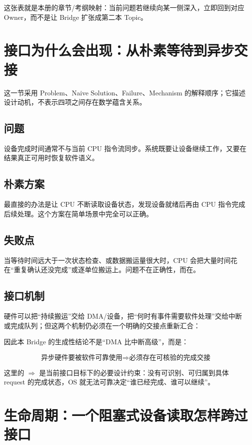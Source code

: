 \documentclass[UTF8,fontset=none,11pt,a4paper]{ctexart}
\begin{document}
这张表就是本册的章节/考纲映射：当前问题若继续向某一侧深入，立即回到对应 Owner，而不是让 Bridge 扩张成第二本 Topic。

\section{接口为什么会出现：从朴素等待到异步交接}

这一节采用 Problem、Naive Solution、Failure、Mechanism 的解释顺序；它描述设计动机，不表示四项之间存在数学蕴含关系。

\subsection{问题}

设备完成时间通常不与当前 CPU 指令流同步。系统既要让设备继续工作，又要在结果真正可用时恢复软件语义。

\subsection{朴素方案}

最直接的办法是让 CPU 不断读取设备状态，发现设备就绪后再由 CPU 指令完成后续处理。这个方案在简单场景中完全可以正确。

\subsection{失败点}

当等待时间远大于一次状态检查、或数据搬运量很大时，CPU 会把大量时间花在“重复确认还没完成”或逐单位搬运上。问题不在正确性，而在。

\subsection{接口机制}

硬件可以把“持续搬运”交给 DMA/设备，把“何时有事件需要软件处理”交给中断或完成队列；但这两个机制仍必须在一个明确的交接点重新汇合：

因此本 Bridge 的生成性结论不是“DMA 比中断高级”，而是：

\[
\boxed{\text{异步硬件要被软件可靠使用} \Rightarrow \text{必须存在可核验的完成交接}}
\]

这里的 $\Rightarrow$ 是当前接口目标下的必要设计约束：没有可识别、可归属到具体 request 的完成状态，OS 就无法可靠决定“谁已经完成、谁可以继续”。

\section{生命周期：一个阻塞式设备读取怎样跨过接口}
\end{document}
